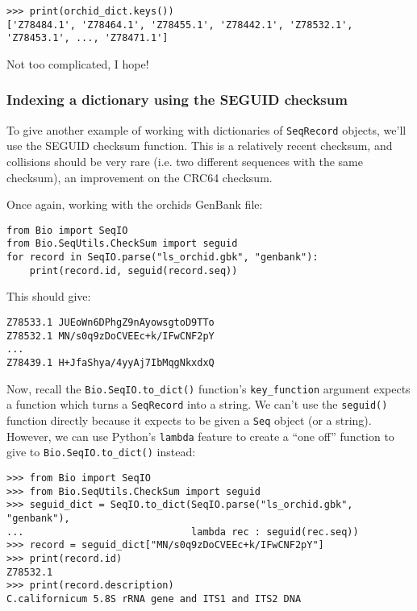 \begin{verbatim}
>>> print(orchid_dict.keys())
['Z78484.1', 'Z78464.1', 'Z78455.1', 'Z78442.1', 'Z78532.1', 'Z78453.1', ..., 'Z78471.1']
\end{verbatim}

\noindent Not too complicated, I hope!

\subsubsection{Indexing a dictionary using the SEGUID checksum}

To give another example of working with dictionaries of \verb|SeqRecord| objects, we'll use the SEGUID checksum function.  This is a relatively recent checksum, and collisions should be very rare (i.e. two different sequences with the same checksum), an improvement on the CRC64 checksum.

Once again, working with the orchids GenBank file:

\begin{verbatim}
from Bio import SeqIO
from Bio.SeqUtils.CheckSum import seguid
for record in SeqIO.parse("ls_orchid.gbk", "genbank"):
    print(record.id, seguid(record.seq))
\end{verbatim}

\noindent This should give:

\begin{verbatim}
Z78533.1 JUEoWn6DPhgZ9nAyowsgtoD9TTo
Z78532.1 MN/s0q9zDoCVEEc+k/IFwCNF2pY
...
Z78439.1 H+JfaShya/4yyAj7IbMqgNkxdxQ
\end{verbatim}

Now, recall the \verb|Bio.SeqIO.to_dict()| function's \verb|key_function| argument expects a function which turns a \verb|SeqRecord| into a string.  We can't use the \verb|seguid()| function directly because it expects to be given a \verb|Seq| object (or a string).  However, we can use Python's \verb|lambda| feature to create a ``one off'' function to give to \verb|Bio.SeqIO.to_dict()| instead:

\begin{verbatim}
>>> from Bio import SeqIO
>>> from Bio.SeqUtils.CheckSum import seguid
>>> seguid_dict = SeqIO.to_dict(SeqIO.parse("ls_orchid.gbk", "genbank"),
...                             lambda rec : seguid(rec.seq))
>>> record = seguid_dict["MN/s0q9zDoCVEEc+k/IFwCNF2pY"]
>>> print(record.id)
Z78532.1
>>> print(record.description)
C.californicum 5.8S rRNA gene and ITS1 and ITS2 DNA
\end{verbatim}

